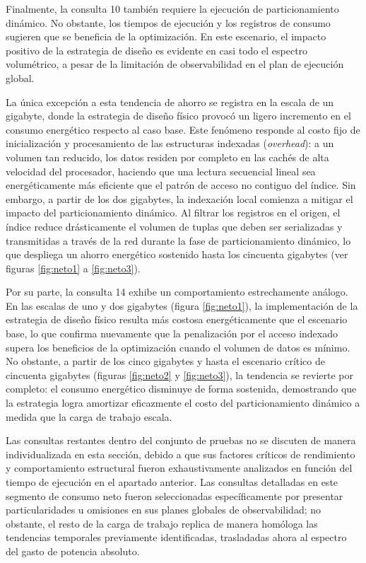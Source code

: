 \documentclass[12pt, letter paper]{report}
\begin{document}
        Finalmente, la consulta 10 también requiere la ejecución de
        particionamiento dinámico. No obstante, los tiempos de ejecución y los
        registros de consumo sugieren que se beneficia de la optimización. En
        este escenario, el impacto positivo de la estrategia de diseño es
        evidente en casi todo el espectro volumétrico, a pesar de la limitación
        de observabilidad en el plan de ejecución global.

        La única excepción a esta tendencia de ahorro se registra en la escala
        de un gigabyte, donde la estrategia de diseño físico provocó un ligero
        incremento en el consumo energético respecto al caso base. Este fenómeno
        responde al costo fijo de inicialización y procesamiento de las
        estructuras indexadas (\textit{overhead}): a un volumen tan reducido,
        los datos residen por completo en las cachés de alta velocidad del
        procesador, haciendo que una lectura secuencial lineal sea
        energéticamente más eficiente que el patrón de acceso no contiguo del
        índice. Sin embargo, a partir de los dos gigabytes, la indexación local
        comienza a mitigar el impacto del particionamiento dinámico. Al filtrar
        los registros en el origen, el índice reduce drásticamente el volumen de
        tuplas que deben ser serializadas y transmitidas a través de la red
        durante la fase de particionamiento dinámico, lo que despliega un ahorro
        energético sostenido hasta los cincuenta gigabytes (ver figuras
        \ref{fig:neto1} a \ref{fig:neto3}).

        Por su parte, la consulta 14 exhibe un comportamiento estrechamente
        análogo. En las escalas de uno y dos gigabytes (figura \ref{fig:neto1}),
        la implementación de la estrategia de diseño físico resulta más costosa
        energéticamente que el escenario base, lo que confirma nuevamente que la
        penalización por el acceso indexado supera los beneficios de la
        optimización cuando el volumen de datos es mínimo. No obstante, a partir
        de los cinco gigabytes y hasta el escenario crítico de cincuenta
        gigabytes (figuras \ref{fig:neto2} y \ref{fig:neto3}), la tendencia se
        revierte por completo: el consumo energético disminuye de forma
        sostenida, demostrando que la estrategia logra amortizar eficazmente el
        costo del particionamiento dinámico a medida que la carga de trabajo
        escala.

        Las consultas restantes dentro del conjunto de pruebas no se discuten de
        manera individualizada en esta sección, debido a que sus factores
        críticos de rendimiento y comportamiento estructural fueron
        exhaustivamente analizados en función del tiempo de ejecución en el
        apartado anterior. Las consultas detalladas en este segmento de consumo
        neto fueron seleccionadas específicamente por presentar particularidades
        u omisiones en sus planes globales de observabilidad; no obstante, el
        resto de la carga de trabajo replica de manera homóloga las tendencias
        temporales previamente identificadas, trasladadas ahora al espectro del
        gasto de potencia absoluto.
\end{document}
